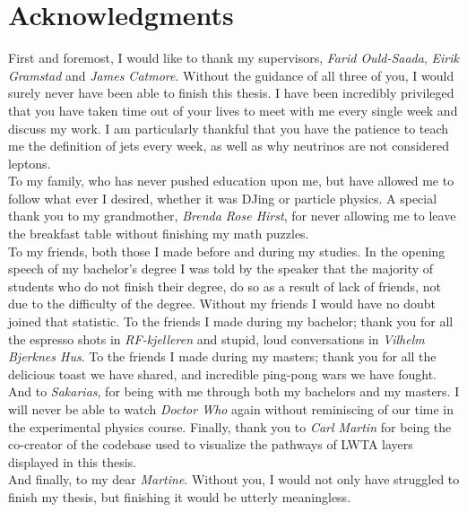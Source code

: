 \chapter*{Acknowledgments}
First and foremost, I would like to thank my supervisors, \emph{Farid Ould-Saada}, \emph{Eirik Gramstad} and \emph{James Catmore}. 
Without the guidance of all three of you, I would surely never have been able to finish this thesis. I have been incredibly
privileged that you have taken time out of your lives to meet with me every single week and discuss my work. 
I am particularly thankful that you have the patience to teach me the definition of jets every week, as well as
why neutrinos are not considered leptons.
\\\newline
To my family, who has never pushed education upon me, but have allowed me to follow what ever I desired, whether it was DJing or 
particle physics. A special thank you to my grandmother, \emph{Brenda Rose Hirst}, for never allowing me to leave the breakfast table 
without finishing my math puzzles.
\\\newline
To my friends, both those I made before and during my studies. In the opening speech of my bachelor's degree I was told by the speaker that 
the majority of students who do not finish their degree, do so as a result of lack of friends, not due to the difficulty of the degree.
Without my friends I would have no doubt joined that statistic. To the friends I made during my bachelor; thank you for all the espresso shots in \emph{RF-kjelleren}
and stupid, loud conversations in \emph{Vilhelm Bjerknes Hus}. To the friends I made during my masters; thank you for all the delicious toast we have shared, and 
incredible ping-pong wars we have fought. And to \emph{Sakarias}, for being with me through both my bachelors and my masters. I will never be able 
to watch \emph{Doctor Who} again without reminiscing of our time in the experimental physics course. Finally, thank you to \emph{Carl Martin} 
for being the co-creator of the codebase used to visualize the pathways of \acs{LWTA} layers displayed in this thesis. 
\\\newline
And finally, to my dear \emph{Martine}. Without you, I would not only have struggled to finish my thesis, but finishing it would be utterly 
meaningless.
